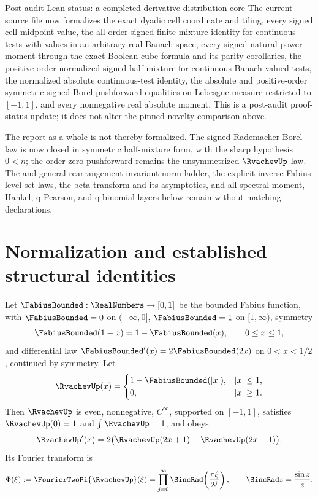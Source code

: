 \documentclass[11pt,oneside]{article}
\theoremstyle{definition}
\theoremstyle{remark}
\begin{document}
\begin{statusbox}{Post-audit Lean status: a completed derivative-distribution core}
The current source file
now formalizes the exact dyadic cell coordinate and tiling, every signed cell-midpoint value,
the all-order signed finite-mixture identity for continuous tests with values in an arbitrary
real Banach space, every signed natural-power moment through the exact Boolean-cube formula
and its parity corollaries, the positive-order normalized signed half-mixture for continuous
Banach-valued tests, the normalized absolute continuous-test identity, the absolute and
positive-order symmetric signed Borel pushforward equalities on Lebesgue measure restricted
to \([-1,1]\), and every nonnegative real absolute moment.  This is a post-audit proof-status
update; it does not alter the pinned novelty comparison above.

The report as a whole is not thereby formalized.  The signed Rademacher Borel law is now
closed in symmetric half-mixture form, with the sharp hypothesis \(0<n\); the order-zero
pushforward remains the unsymmetrized \(\RvachevUp\) law.  The  and general
rearrangement-invariant norm ladder, the explicit inverse-Fabius level-set laws, the beta
transform and its asymptotics, and all spectral-moment, Hankel, q-Pearson, and q-binomial
layers below remain without matching declarations.
\end{statusbox}

\section{Normalization and established structural identities}
\label{p4:sec:baseline}

Let $\FabiusBounded:\RealNumbers\to[0,1]$ be the bounded Fabius function, with
$\FabiusBounded=0$ on $(-\infty,0]$, $\FabiusBounded=1$ on $[1,\infty)$,
symmetry
\begin{equation}
 \FabiusBounded(1-x)=1-\FabiusBounded(x),\qquad 0\leq x\leq1,
 \label{p4:eq:F-symmetry}
\end{equation}
and differential law $\FabiusBounded'(x)=2\FabiusBounded(2x)$ on
$0<x<1/2$, continued by symmetry.  Let
\begin{equation}
 \RvachevUp(x)=
 \begin{cases}
  1-\FabiusBounded(|x|),&|x|\leq1,\\
  0,&|x|\geq1.
 \end{cases}
 \label{p4:eq:up-from-F}
\end{equation}
Then $\RvachevUp$ is even, nonnegative, $C^\infty$, supported on $[-1,1]$, satisfies
$\RvachevUp(0)=1$ and $\int\RvachevUp=1$, and obeys
\begin{equation}
 \RvachevUp'(x)=2\bigl(\RvachevUp(2x+1)-\RvachevUp(2x-1)\bigr).
 \label{p4:eq:up-differential}
\end{equation}
Its Fourier transform is
\begin{equation}
 \Phi(\xi):=\FourierTwoPi{\RvachevUp}(\xi)
 =\prod_{j=0}^{\infty}\SincRad\!\left(\frac{\pi\xi}{2^j}\right),
 \qquad \SincRad z=\frac{\sin z}{z}.
 \label{p4:eq:phi-product}
\end{equation}
\end{document}
